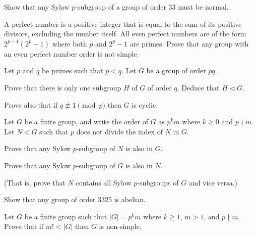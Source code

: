 \begin{problem}
    Show that any Sylow $p$-subgroup of a group of order 33 must be normal.
\end{problem}

\begin{problem}
    A perfect number is a positive integer that is equal to the sum of its positive divisors, excluding the number itself. All even perfect numbers are of the form $2^{p-1}\left(2^p-1\right)$ where both $p$ and $2^p-1$ are primes. Prove that any group with an even perfect number order is not simple.
\end{problem}

\begin{problem}\label{problem-group-of-order-pq-has-normal-subgroup-of-order-q}
    Let $p$ and $q$ be primes such that $p < q$. Let $G$ be a group of order $pq$.
    \begin{partquestions}{\roman*}
        \item Prove that there is only one subgroup $H$ of $G$ of order $q$. Deduce that $H \lhd G$.
        \item Prove also that if $q \not\equiv 1 \pmod p$ then $G$ is cyclic.
    \end{partquestions}
\end{problem}

\begin{problem}\label{problem-normal-subgroup-of-G-contains-all-sylow-p-subgroups}
    Let $G$ be a finite group, and write the order of $G$ as $p^km$ where $k \geq 0$ and $p \nmid m$. Let $N \lhd G$ such that $p$ does not divide the index of $N$ in $G$.
    \begin{partquestions}{\roman*}
        \item Prove that any Sylow $p$-subgroup of $N$ is also in $G$.
        \item Prove that any Sylow $p$-subgroup of $G$ is also in $N$.
    \end{partquestions}
    (That is, prove that $N$ contains all Sylow $p$-subgroups of $G$ and vice versa.)
\end{problem}

\begin{problem}
    Show that any group of order 3325 is abelian.
\end{problem}

\begin{problem}\label{problem-if-m!<|G|-then-G-is-simple}
    Let $G$ be a finite group such that $|G| = p^km$ where $k \geq 1$, $m > 1$, and $p \nmid m$. Prove that if $m! < |G|$ then $G$ is non-simple.
\end{problem}

